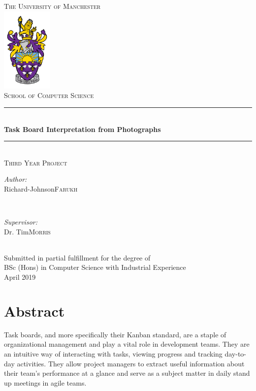 \documentclass[12pt]{report}
\title{\thesistitle}
\author{\thesisauthorfirst\space\thesisauthorsecond}
\date{\thesisdate}
\def\thesistitle{Task Board Interpretation from Photographs}
\def\thesisauthorfirst{Richard-Johnson}
\def\thesisauthorsecond{Farukh}
\def\thesissupervisorfirst{Dr. Tim}
\def\thesissupervisorsecond{Morris}
\def\thesisdate{April 2019}
\theoremstyle{definition}
\theoremstyle{remark}
\begin{document}
\begin{titlepage}
	\thispagestyle{empty}
	\newcommand{\HRule}{\rule{\linewidth}{0.5mm}}
	\center
	\textsc{\Large The University of Manchester}\\[.7cm]
	\includegraphics[width=25mm]{Crest_fullcolour.jpg}\\[.5cm]
	\textsc{School of Computer Science}\\[0.5cm]
	
	\HRule \\[0.4cm]
	{ \huge \bfseries \thesistitle}\\[0.1cm]
	\HRule \\[.5cm]
	\textsc{\large Third Year Project}\\[.5cm]
	
	\begin{minipage}{0.4\textwidth}
	\begin{flushleft} \large
	\emph{Author:}\\
	\thesisauthorfirst\space \textsc{\thesisauthorsecond}
	\end{flushleft}
	\end{minipage}
	~
	\begin{minipage}{0.4\textwidth}
	\begin{flushright} \large
	\emph{Supervisor:} \\
	\thesissupervisorfirst\space \textsc{\thesissupervisorsecond} \\[1em]
	\end{flushright}
    \end{minipage}\\[4cm]
    \normalsize{Submitted in partial fulfillment for the degree of}\\[0.1cm]
    \normalsize{BSc (Hons) in Computer Science with Industrial Experience}\\[0.5cm]
	\vfill
	{\large \thesisdate}\\
	\clearpage
\end{titlepage}

\chapter*{Abstract}
Task boards, and more specifically their Kanban standard, are a staple of organizational management and play a vital role in development teams. They are an intuitive way of interacting with tasks, viewing progress and tracking day-to-day activities. They allow project managers to extract useful information about their team's performance at a glance and serve as a subject matter in daily stand up meetings in agile teams.
\end{document}
